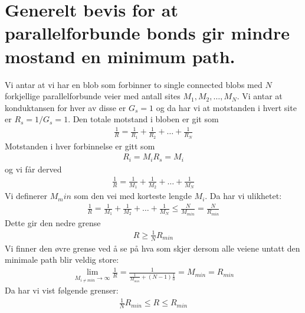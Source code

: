 \documentclass[reprint, amsmath, amssymb, aps]{revtex4-2}
\begin{document}
\section{Generelt bevis for at parallelforbunde bonds gir mindre mostand en minimum path.}
Vi antar at vi har en blob som forbinner to single connected blobs med $N$ forkjellige parallelforbunde veier med antall sites $M_1, M_2, \hdots, M_N$. Vi antar at konduktansen for hver av disse er $G_s=1$ og da har vi at motstanden i hvert site er $R_s = 1/G_s = 1$. Den totale motstand i bloben er git som
\begin{align*}
  \frac{1}{R} = \frac{1}{R_1} + \frac{1}{R_2} + \hdots + \frac{1}{R_N}
\end{align*}
Motstanden i hver forbinnelse er gitt som
\begin{align*}
 R_i = M_iR_s = M_i
\end{align*}
og vi får derved
\begin{align*}
 \frac{1}{R} = \frac{1}{M_1} + \frac{1}{M_2} + \hdots + \frac{1}{M_N}
\end{align*}
Vi definerer $M_min$ som den vei med korteste lengde $M_i$. Da har vi ulikhetet:
\begin{align*}
   \frac{1}{R} = \frac{1}{M_1} + \frac{1}{M_2} + \hdots + \frac{1}{M_N} \le \frac{N}{M_{min}} = \frac{N}{R_{min}}
\end{align*}
Dette gir den nedre grense
\begin{align*}
 R \ge \frac{1}{N} R_{min}
\end{align*}
Vi finner den øvre grense ved å se på hva som skjer dersom alle veiene untatt den minimale path blir veldig store:
\begin{align*}
 \lim_{M_{i\ne min}\to \infty} \frac{1}{R} = \frac{1}{\frac{1}{M_{min}} + (N-1)\frac{1}{0}} = M_{min} = R_{min}
\end{align*}
Da har vi vist følgende grenser:
\begin{align*}
 \frac{1}{N} R_{min} \le R \le R_{min}
\end{align*}
\end{document}
